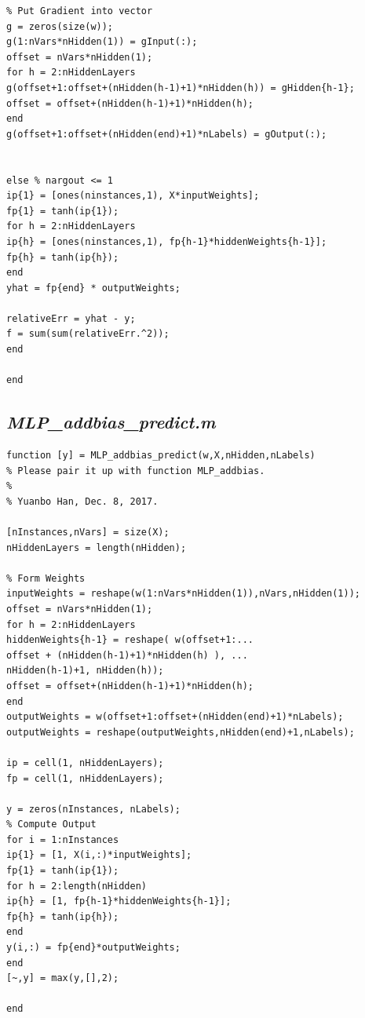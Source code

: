 \documentclass{article}
\begin{document}
\begin{lstlisting}
% Put Gradient into vector
g = zeros(size(w));
g(1:nVars*nHidden(1)) = gInput(:);
offset = nVars*nHidden(1);
for h = 2:nHiddenLayers
g(offset+1:offset+(nHidden(h-1)+1)*nHidden(h)) = gHidden{h-1};
offset = offset+(nHidden(h-1)+1)*nHidden(h);
end
g(offset+1:offset+(nHidden(end)+1)*nLabels) = gOutput(:);


else % nargout <= 1
ip{1} = [ones(ninstances,1), X*inputWeights];
fp{1} = tanh(ip{1});
for h = 2:nHiddenLayers
ip{h} = [ones(ninstances,1), fp{h-1}*hiddenWeights{h-1}];
fp{h} = tanh(ip{h});
end
yhat = fp{end} * outputWeights;

relativeErr = yhat - y;
f = sum(sum(relativeErr.^2));
end

end
\end{lstlisting}

\subsection{\emph{MLP\_addbias\_predict.m}}
\begin{lstlisting}
function [y] = MLP_addbias_predict(w,X,nHidden,nLabels)
% Please pair it up with function MLP_addbias.
%
% Yuanbo Han, Dec. 8, 2017.

[nInstances,nVars] = size(X);
nHiddenLayers = length(nHidden);

% Form Weights
inputWeights = reshape(w(1:nVars*nHidden(1)),nVars,nHidden(1));
offset = nVars*nHidden(1);
for h = 2:nHiddenLayers
hiddenWeights{h-1} = reshape( w(offset+1:...
offset + (nHidden(h-1)+1)*nHidden(h) ), ...
nHidden(h-1)+1, nHidden(h));
offset = offset+(nHidden(h-1)+1)*nHidden(h);
end
outputWeights = w(offset+1:offset+(nHidden(end)+1)*nLabels);
outputWeights = reshape(outputWeights,nHidden(end)+1,nLabels);

ip = cell(1, nHiddenLayers);
fp = cell(1, nHiddenLayers);

y = zeros(nInstances, nLabels);
% Compute Output
for i = 1:nInstances
ip{1} = [1, X(i,:)*inputWeights];
fp{1} = tanh(ip{1});
for h = 2:length(nHidden)
ip{h} = [1, fp{h-1}*hiddenWeights{h-1}];
fp{h} = tanh(ip{h});
end
y(i,:) = fp{end}*outputWeights;
end
[~,y] = max(y,[],2);

end
\end{lstlisting}
\end{document}
